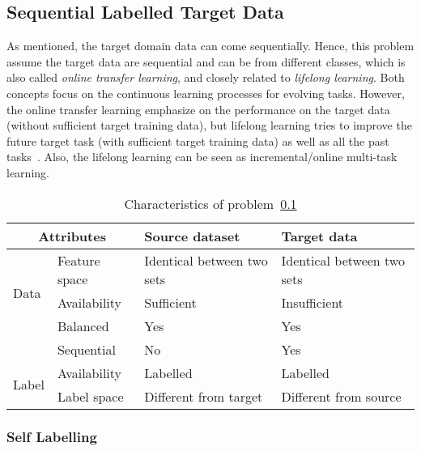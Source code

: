 \documentclass[prodmode]{acmsmall}  %
\begin{document}
\subsection{Sequential Labelled Target Data}
\label{sec:HETElseq}
As mentioned, the target domain data can come sequentially. 
Hence, this problem assume the target data are sequential and can be from different classes, which is also called \textit{online transfer learning}, and closely related to \textit{lifelong learning}. Both concepts focus on the continuous learning processes for evolving tasks. However, the online transfer learning emphasize on the performance on the target data (without sufficient target training data), but lifelong learning tries to improve the future target task (with sufficient target training data) as well as all the past tasks~\cite{Chen2015c}. Also, the lifelong learning can be seen as incremental/online multi-task learning.
\begin{table}[htbp!]
\caption{Characteristics of problem~\ref{sec:HETElseq}}
\label{tab:HETElseq}
\begin{center}
\begin{small}
\begin{tabular}{|p{1cm}<{\centering}|m{2.5cm}<{\centering}|m{4.3cm}<{\centering}|m{4.3cm}<{\centering}|}
\hline
\multicolumn{2}{|c|}{Attributes} & Source dataset & Target data \\
\hline \hline
\multirow{3}{*}{Data} & Feature space & Identical between two sets & Identical between two sets \\ 
\cline{2-4}{} & Availability & Sufficient & {\color{red}Insufficient} \\
\cline{2-4}{} & Balanced & Yes & Yes \\
\cline{2-4}{} & Sequential & No & {\color{red}Yes}  \\
\hline \hline
\multirow{2}{*}{Label} & Availability & Labelled & Labelled \\
\cline{2-4}{}  & Label space & Different from target & {\color{red}Different from source} \\ 
\hline
\end{tabular}
\end{small}
\end{center}
\end{table}
\subsubsection{Self Labelling}
\end{document}
